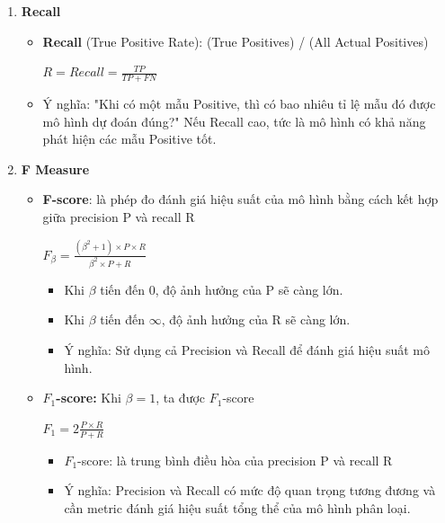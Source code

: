 \begin{enumerate}
    \item \textbf{Recall} \cite{precision_recall} 
    \begin{itemize}
        \item \textbf{Recall} (True Positive Rate): (True Positives) / (All Actual Positives)
        \begin{center}
        \large $R = Recall = \frac{TP}{TP + FN}$
        \end{center}
        \item Ý nghĩa: "Khi có một mẫu Positive, thì có bao nhiêu tỉ lệ mẫu đó được mô hình dự đoán đúng?" Nếu Recall cao, tức là mô hình có khả năng phát hiện các mẫu Positive tốt.
    \end{itemize}

    \item \textbf{F Measure} \cite{fmeasure}
    \begin{itemize}
        \item \textbf{F-score}: là phép đo đánh giá hiệu suất của mô hình bằng cách kết hợp giữa precision P và recall R
        \begin{center}
        \large $F_\beta = \frac{(\beta^{2} + 1)\times P \times R}{\beta^{2}\times P + R}$
        \end{center}
        \begin{itemize}
            \item Khi $\beta$ tiến đến 0, độ ảnh hưởng của P sẽ càng lớn.
            \item Khi $\beta$ tiến đến $\infty $, độ ảnh hưởng của R sẽ càng lớn.
            \item Ý nghĩa: Sử dụng cả Precision và Recall để đánh giá hiệu suất mô hình.
        \end{itemize}
        \item \textbf{$F_1$-score:} Khi $\beta = 1$, ta được $F_1$-score
        \begin{center}
        \large $F_1 = 2 \frac{P \times R}{P + R}$
        \end{center}
        \begin{itemize}
            \item $F_1$-score: là trung bình điều hòa của precision P và recall R
            \item Ý nghĩa: Precision và Recall có mức độ quan trọng tương đương và cần metric đánh giá hiệu suất tổng thể của mô hình phân loại.
        \end{itemize}
    \end{itemize}


\end{enumerate}
